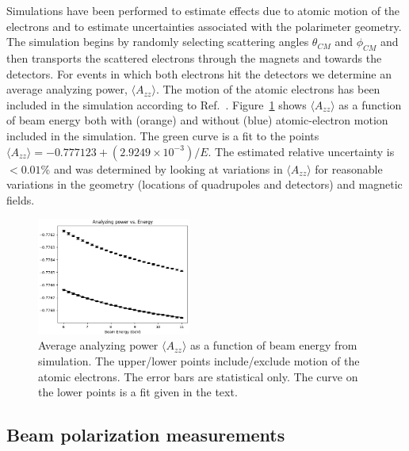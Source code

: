 Simulations have been performed to estimate effects due to atomic motion of the electrons and to estimate uncertainties associated with 
the polarimeter geometry. The simulation begins by randomly selecting scattering angles $\theta_{CM}$ and $\phi_{CM}$ and then transports
the scattered electrons through the magnets and towards the detectors. For events in which both electrons hit the detectors we determine an 
average analyzing power, $\langle A_{zz}\rangle$. The motion of the atomic electrons has been included in the simulation according to
Ref.~\cite{levchuk94}. Figure~\ref{fig-Azz} shows $\langle A_{zz}\rangle$ as a function of beam energy both with (orange) and without 
(blue) atomic-electron motion included in the simulation. The green curve is a fit to the points 
$\langle A_{zz}\rangle= -0.777123+(2.9249\times 10^{-3})/E$. 
The estimated relative uncertainty is $<0.01$\% and was determined by looking at variations in $\langle A_{zz}\rangle$ for reasonable 
variations in the geometry (locations of quadrupoles and detectors) and magnetic fields.
\begin{figure}[ht]
 \begin{center}
  \includegraphics[width=0.45\textwidth]{Azz.png}
 \end{center}
	\caption{Average analyzing power $\langle A_{zz}\rangle$ as a function of beam energy from simulation. The upper/lower points 
	include/exclude motion of the atomic electrons. The error bars are statistical only. The curve on the lower points is a fit 
	given in the text.}
 \label{fig-Azz}
\end{figure}




\subsection{Beam polarization measurements}
\label{sec-SpinDance}

